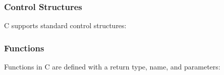 \hypertarget{control-structures-1}{%
\subsubsection{Control Structures}\label{control-structures-1}}

C supports standard control structures:

\begin{Shaded}
\begin{Highlighting}[]
\NormalTok{;}
\NormalTok{) \{}
\NormalTok{);}
\NormalTok{\} }\NormalTok{ \{}
\NormalTok{);}
\NormalTok{\}}

\NormalTok{ (}
\NormalTok{\}}

\NormalTok{;}
\NormalTok{) \{}
\NormalTok{\}}
\end{Highlighting}
\end{Shaded}

\hypertarget{functions-1}{%
\subsubsection{Functions}\label{functions-1}}

Functions in C are defined with a return type, name, and parameters:

\begin{Shaded}
\begin{Highlighting}[]
    \NormalTok{) \{}
         \NormalTok{;}
\NormalTok{    \} }\NormalTok{ \{}
        \NormalTok{);}
\NormalTok{    \}}
\NormalTok{\}}

\NormalTok{));}
     \NormalTok{;}
\NormalTok{\}}
\end{Highlighting}
\end{Shaded}

